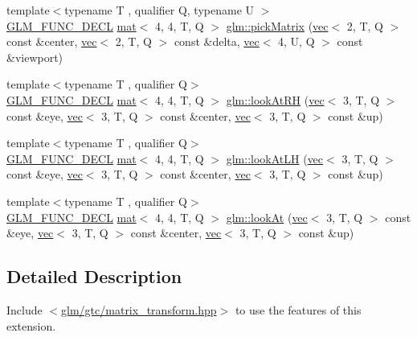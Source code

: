 \begin{DoxyCompactItemize}
\item 
{\footnotesize template$<$typename T , qualifier Q, typename U $>$ }\\\hyperlink{setup_8hpp_ab2d052de21a70539923e9bcbf6e83a51}{G\+L\+M\+\_\+\+F\+U\+N\+C\+\_\+\+D\+E\+CL} \hyperlink{structglm_1_1mat}{mat}$<$ 4, 4, T, Q $>$ \hyperlink{group__gtc__matrix__transform_gaf6b21eadb7ac2ecbbe258a9a233b4c82}{glm\+::pick\+Matrix} (\hyperlink{structglm_1_1vec}{vec}$<$ 2, T, Q $>$ const \&center, \hyperlink{structglm_1_1vec}{vec}$<$ 2, T, Q $>$ const \&delta, \hyperlink{structglm_1_1vec}{vec}$<$ 4, U, Q $>$ const \&viewport)
\item 
{\footnotesize template$<$typename T , qualifier Q$>$ }\\\hyperlink{setup_8hpp_ab2d052de21a70539923e9bcbf6e83a51}{G\+L\+M\+\_\+\+F\+U\+N\+C\+\_\+\+D\+E\+CL} \hyperlink{structglm_1_1mat}{mat}$<$ 4, 4, T, Q $>$ \hyperlink{group__gtc__matrix__transform_gacfa12c8889c754846bc20c65d9b5c701}{glm\+::look\+At\+RH} (\hyperlink{structglm_1_1vec}{vec}$<$ 3, T, Q $>$ const \&eye, \hyperlink{structglm_1_1vec}{vec}$<$ 3, T, Q $>$ const \&center, \hyperlink{structglm_1_1vec}{vec}$<$ 3, T, Q $>$ const \&up)
\item 
{\footnotesize template$<$typename T , qualifier Q$>$ }\\\hyperlink{setup_8hpp_ab2d052de21a70539923e9bcbf6e83a51}{G\+L\+M\+\_\+\+F\+U\+N\+C\+\_\+\+D\+E\+CL} \hyperlink{structglm_1_1mat}{mat}$<$ 4, 4, T, Q $>$ \hyperlink{group__gtc__matrix__transform_gab2c09e25b0a16d3a9d89cc85bbae41b0}{glm\+::look\+At\+LH} (\hyperlink{structglm_1_1vec}{vec}$<$ 3, T, Q $>$ const \&eye, \hyperlink{structglm_1_1vec}{vec}$<$ 3, T, Q $>$ const \&center, \hyperlink{structglm_1_1vec}{vec}$<$ 3, T, Q $>$ const \&up)
\item 
{\footnotesize template$<$typename T , qualifier Q$>$ }\\\hyperlink{setup_8hpp_ab2d052de21a70539923e9bcbf6e83a51}{G\+L\+M\+\_\+\+F\+U\+N\+C\+\_\+\+D\+E\+CL} \hyperlink{structglm_1_1mat}{mat}$<$ 4, 4, T, Q $>$ \hyperlink{group__gtc__matrix__transform_gaa64aa951a0e99136bba9008d2b59c78e}{glm\+::look\+At} (\hyperlink{structglm_1_1vec}{vec}$<$ 3, T, Q $>$ const \&eye, \hyperlink{structglm_1_1vec}{vec}$<$ 3, T, Q $>$ const \&center, \hyperlink{structglm_1_1vec}{vec}$<$ 3, T, Q $>$ const \&up)
\end{DoxyCompactItemize}


\subsection{Detailed Description}
Include $<$\hyperlink{matrix__transform_8hpp}{glm/gtc/matrix\+\_\+transform.\+hpp}$>$ to use the features of this extension.

